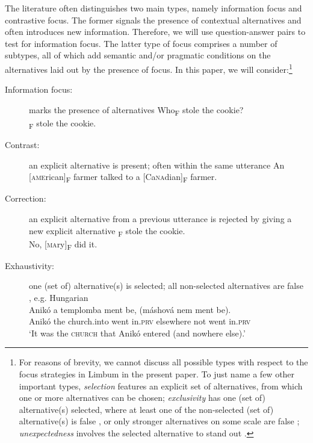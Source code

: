\documentclass[output=paper,
modfonts
]{langscibook}
\begin{document}
The literature often distinguishes two main types, namely information focus and contrastive focus. The former signals the presence of contextual alternatives and often introduces new information. Therefore, we will use question-answer pairs to test for information focus. The latter type of focus comprises a number of subtypes, all of which add semantic and/or pragmatic conditions on the alternatives laid out by the presence of focus. In this paper, we will consider:\footnote{For reasons of brevity, we cannot discuss all possible types with respect to the focus strategies in Limbum in the present paper. To just name a few other important types, \textit{selection} features an explicit set of alternatives, from which one or more alternatives can be chosen; \textit{exclusivity} has one (set of) alternative(s) selected, where at least one of the non-selected (set of) alternative(s) is false \citep{vanderWal2011,vanderWal2014}, or only stronger alternatives on some scale are false \citep{Beaver2008,Coppock2012}; \textit{unexpectedness} involves the selected alternative to stand out \citep{Zimmermann2008,Zimmermann2011a,Hartmann2008,Skopeteas2009,Skopeteas2011,Frey2010,Zimmermann2011a,Destruel2014}. }
\begin{description}
\item[Information focus:] marks the presence of alternatives
\ea Who\textsubscript{F} stole the cookie?\\ \textsubscript{F} stole the cookie. \z
\item[Contrast:] an explicit alternative is present; often within the same utterance
\ea An [\textsc{\MakeLowercase{AME}}rican]\textsubscript{F} farmer talked to a [Ca\textsc{\MakeLowercase{NA}}dian]\textsubscript{F} farmer. \z
\item[Correction:] an explicit alternative from a previous utterance is rejected by giving a new explicit alternative
\ea {}\textsubscript{F} stole the cookie.\\ No, [\textsc{\MakeLowercase{MA}}ry]\textsubscript{F} did it.\z
\item[Exhaustivity:] one (set of) alternative(s) is selected; all non-selected alternatives are false \citep{Szabolcsi1981,Kiss1998,Vallduvi1998,Horvath2010,Horvath2013}, e.g.
\ea
Hungarian\\
\gll Anikó a templomba ment be, (máshová nem ment be).\\
Anikó the church.into went in.\textsc{prv} elsewhere not went in.\textsc{prv}\\
\glt `It was the \textsc{\MakeLowercase{CHURCH}} that Anikó entered (and nowhere else).'
\z 
\end{description}
\end{document}
